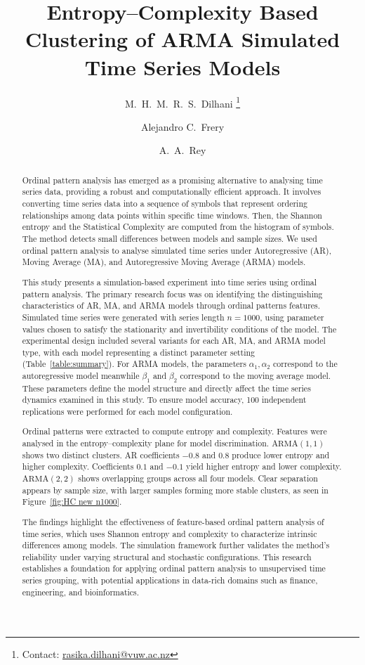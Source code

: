 \documentclass[11pt,a4paper]{article}
\title{\vspace{-1cm}Entropy–Complexity Based Clustering of ARMA Simulated Time Series Models\vspace{-0.3cm}}
\author[1]{M.\ H.\ M.\ R.\ S.\ Dilhani \thanks{Contact: \href{mailto:rasika.dilhani@vuw.ac.nz}{rasika.dilhani@vuw.ac.nz}}}
\author[1]{Alejandro C.\ Frery}
\author[2]{A.\ A.\ Rey}
\affil[1]{School of Mathematics and Statistics, Victoria University of Wellington, New Zealand}
\affil[2]{Laboratorio de Investigación y Desarrollo Experimental en Computación (LIDEC),\\
	Instituto de Tecnología e Ingeniería, Universidad Nacional de Hurlingham (UNAHUR), Argentina}
\date{}
\begin{document}
	\maketitle
	\vspace{-0.5cm}
	
	\begin{abstract}
		
				
Ordinal pattern analysis has emerged as a promising alternative to analysing time series data, providing a robust and computationally efficient approach. 
It involves converting time series data into a sequence of symbols that represent ordering relationships among data points within specific time windows.  
Then, the Shannon entropy and the Statistical Complexity are computed from the histogram of symbols. 
The method detects small differences between models and sample sizes.
We used ordinal pattern analysis to analyse simulated time series under Autoregressive (AR), Moving Average (MA), and Autoregressive Moving Average (ARMA) models. 
		
This study presents a simulation-based experiment into time series using ordinal pattern analysis. 
The primary research focus was on identifying the distinguishing characteristics of AR, MA, and ARMA models through ordinal patterns features. 
Simulated time series were generated with series length $n = 1000$, using parameter values chosen to satisfy the stationarity and invertibility conditions of the model. 
The experimental design included several variants for each AR, MA, and ARMA model type, with each model representing a distinct parameter setting (Table~\ref{table:summary}). 
For ARMA models, the parameters $\alpha_1, \alpha_2$ correspond to the autoregressive model meanwhile $\beta_1$ and $\beta_2$ correspond to the moving average model.
These parameters define the model structure and directly affect the time series dynamics examined in this study.
To ensure model accuracy, 100 independent replications were performed for each model configuration.
		
Ordinal patterns were extracted to compute entropy and complexity. 
Features were analysed in the entropy–complexity plane for model discrimination. 
$\mathrm{ARMA}(1,1)$ shows two distinct clusters.
AR coefficients $-0.8$ and $0.8$ produce lower entropy and higher complexity. 
Coefficients $0.1$ and $-0.1$ yield higher entropy and lower complexity. 
$\mathrm{ARMA}(2,2)$ shows overlapping groups across all four models. 
Clear separation appears by sample size, with larger samples forming more stable clusters, as seen in Figure~\ref{fig:HC new n1000}.
			
The findings highlight the effectiveness of feature-based ordinal pattern analysis of time series, which uses Shannon entropy and complexity to characterize intrinsic differences among models. 
The simulation framework further validates the method’s reliability under varying structural and stochastic configurations. 
This research establishes a foundation for applying ordinal pattern analysis to unsupervised time series grouping, with potential applications in data-rich domains such as finance, engineering, and bioinformatics.
		
	\end{abstract}
	
\end{document}
